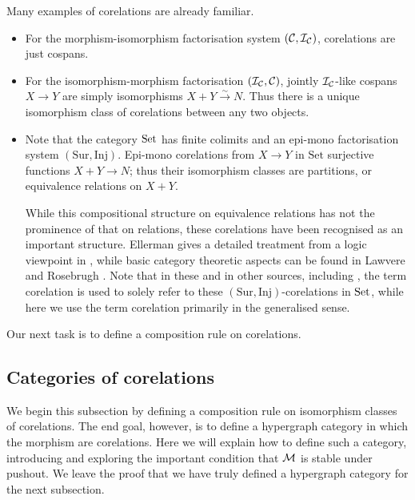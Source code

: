 \begin{examples} \label{ex.corels}
  Many examples of corelations are already familiar.
  \begin{itemize}
    \item For the morphism-isomorphism factorisation system $(\mathcal C,\mathcal I_{\mathcal
      C})$, corelations are just cospans.

    \item For the isomorphism-morphism factorisation $(\mathcal I_{\mathcal C}, \mathcal C)$,
      jointly $\mathcal I_{\mathcal C}$-like cospans $X \to Y$ are simply isomorphisms
      $X+Y \stackrel\sim\to N$. Thus there is a unique isomorphism class of
      corelations between any two objects.

    \item Note that the category $\mathrm{Set}$ has finite colimits and an epi-mono
      factorisation system $(\mathrm{Sur},\mathrm{Inj})$. Epi-mono corelations
      from $X \to Y$ in $\mathrm{Set}$ surjective functions $X+Y \to N$; thus
      their isomorphism classes are partitions, or equivalence relations on
      $X+Y$. 

      While this compositional structure on equivalence relations has not the
      prominence of that on relations, these corelations have been recognised as
      an important structure. Ellerman gives a detailed treatment from a logic
      viewpoint in \cite{Ell14}, while basic category theoretic aspects can be
      found in Lawvere and Rosebrugh \cite{LR}.  Note that in these and in other
      sources, including \cite{CF,BF}, the term corelation is used to solely
      refer to these $(\mathrm{Sur},\mathrm{Inj})$-corelations in $\mathrm{Set}$, while
      here we use the term corelation primarily in the generalised sense.
  \end{itemize}
\end{examples}

Our next task is to define a composition rule on corelations.

\subsection{Categories of corelations}
We begin this subsection by defining a composition rule on isomorphism classes
of corelations. The end goal, however, is to define a hypergraph category in
which the morphism are corelations. Here we will explain how to define such a
category, introducing and exploring the important condition that $\mathcal M$ is
stable under pushout. We leave the proof that we have truly defined a hypergraph
category for the next subsection.

